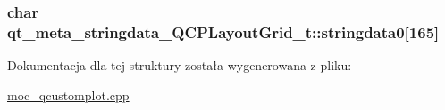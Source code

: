 \subsubsection[{\texorpdfstring{stringdata0}{stringdata0}}]{\setlength{\rightskip}{0pt plus 5cm}char qt\+\_\+meta\+\_\+stringdata\+\_\+\+Q\+C\+P\+Layout\+Grid\+\_\+t\+::stringdata0\mbox{[}165\mbox{]}}\hypertarget{structqt__meta__stringdata___q_c_p_layout_grid__t_a0592c486ce0adf2a3a83670727f00df2}{}\label{structqt__meta__stringdata___q_c_p_layout_grid__t_a0592c486ce0adf2a3a83670727f00df2}


Dokumentacja dla tej struktury została wygenerowana z pliku\+:\begin{DoxyCompactItemize}
\item 
\hyperlink{moc__qcustomplot_8cpp}{moc\+\_\+qcustomplot.\+cpp}\end{DoxyCompactItemize}
